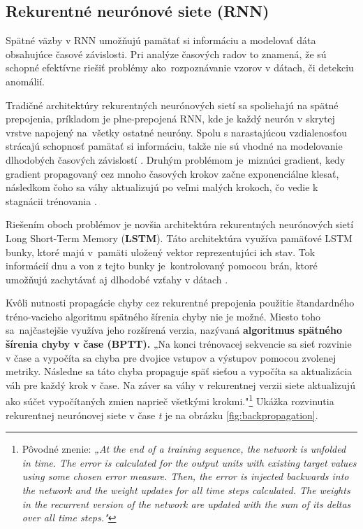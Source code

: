 \subsection{Rekurentné neurónové siete (RNN)}

Spätné väzby v RNN umožňujú pamätať si informáciu a modelovať dáta obsahujúce časové závislosti. Pri analýze časových radov to znamená, že sú schopné efektívne riešiť problémy ako~rozpoznávanie vzorov v dátach, či detekciu anomálií. 

Tradičné architektúry rekurentných neurónových sietí sa spoliehajú na spätné prepojenia, príkladom je plne-prepojená RNN, kde je každý neurón v skrytej vrstve napojený na~všetky ostatné neuróny. Spolu s narastajúcou vzdialenosťou strácajú schopnosť pamätať si informáciu, takže nie sú vhodné na modelovanie dlhodobých časových závislostí \cite{Staudemeyer2019}. Druhým problémom je~miznúci gradient, kedy gradient propagovaný cez mnoho časových krokov začne exponenciálne klesať, následkom čoho sa váhy aktualizujú po veľmi malých krokoch, čo vedie k stagnácii trénovania \cite{Hochreiter1998}. 

Riešením oboch problémov je novšia architektúra rekurentných neurónových sietí Long Short-Term Memory (\textbf{LSTM}). Táto architektúra využíva pamäťové LSTM bunky, ktoré majú v~pamäti uložený vektor reprezentujúci ich stav. Tok informácií dnu a von z tejto bunky je~kontrolovaný pomocou brán, ktoré umožňujú zachytávať aj dlhodobé vzťahy v dátach \cite{Yu2019}.

Kvôli nutnosti propagácie chyby cez rekurentné prepojenia použitie štandardného tréno-vacieho algoritmu spätného šírenia chyby nie je možné. Miesto toho sa~najčastejšie využíva jeho rozšírená verzia, nazývaná \textbf{algoritmus spätného šírenia chyby v čase (BPTT).} „Na konci trénovacej sekvencie sa sieť rozvinie v čase a vypočíta sa chyba pre dvojice vstupov a výstupov pomocou zvolenej metriky. Následne sa táto chyba propaguje späť sieťou a vypočíta sa aktualizácia váh pre každý krok v čase. Na záver sa váhy v rekurentnej verzii siete aktualizujú ako súčet vypočítaných zmien naprieč všetkými krokmi."\footnote{Pôvodné znenie: \textit{„At the end of a training sequence, the network is unfolded in time. The error is calculated for the output units with existing target values using some chosen error measure. Then, the error is injected backwards into the network and the weight updates for all time steps calculated. The weights in the recurrent version of the network are updated with the sum of its deltas over all time steps."}} \cite{Yu2019} Ukážka rozvinutia rekurentnej neurónovej siete v čase \textit{t} je na obrázku \ref{fig:backpropagation}.

